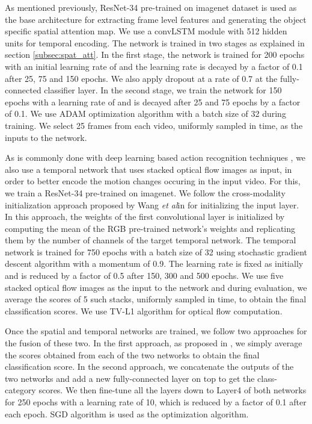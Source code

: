 \documentclass{bmvc2k}
\def\etal{\emph{et al}\bmvaOneDot}
\newcommand{\rev}[2]{#2}
\begin{document}
As mentioned previously, ResNet-34 pre-trained on imagenet dataset is used as the base architecture for extracting frame level features and generating the object specific spatial attention map. We use a convLSTM module with 512 hidden units for temporal encoding. The network is trained in two stages as explained in section \ref{subsec:spat_att}. In the first stage, the network is trained for 200 epochs with an initial learning rate of  and the learning rate is decayed by a factor of 0.1 after 25, 75 and 150 epochs. We also apply dropout at a rate of 0.7 at the fully-connected classifier layer. In the second stage, we train the network for 150 epochs with a learning rate of  and is decayed after 25 and 75 epochs by a factor of 0.1. We use ADAM optimization algorithm with a batch size of 32 during training. We select 25 frames from each video, uniformly sampled in time, as the inputs to the network.

As is commonly done with deep learning based action recognition techniques \cite{simonyan2014two} \cite{TSN2016ECCV} \cite{ma2016deeper} \cite{singh2016first} \cite{tang2017action} \cite{carreira2017quo}, we also use a temporal network that uses stacked optical flow images as input, in order to better encode the motion changes occuring in the input video. For this, we train a ResNet-34 pre-trained on imagenet. We follow the cross-modality initialization approach proposed by Wang \etal in \cite{TSN2016ECCV} for initializing the input layer. In this approach, the weights of the first convolutional layer is initialized by computing the mean of the RGB pre-trained network's weights and replicating them by the number of channels of the target temporal network. The temporal network is trained for 750 epochs with a batch size of 32 using stochastic gradient descent algorithm with a momentum of 0.9. The learning rate is fixed as  initially and is reduced by a factor of 0.5 after 150, 300 and 500 epochs. We use five stacked optical flow images as the input to the network and during evaluation, we average the scores of 5 such stacks, uniformly sampled in time, to obtain the final classification scores. We use TV-L1 algorithm \cite{zach2007duality} for optical flow computation.

Once the spatial and temporal networks are trained, we follow two approaches for the fusion of these two. In the first approach, as proposed in \cite{simonyan2014two}, we simply average the scores obtained from each of the two networks to obtain the final classification score. In the second approach, we concatenate the outputs of the two networks and add a new fully-connected layer on top to get the class-category scores. \rev{We then train the newly added fully-connected layer along with the fully-connected layers of the individual networks for 50 epochs with a learning rate of  which is reduced by a factor of 0.5 after 5, 20 and 50 epochs}{We then fine-tune all the layers down to Layer4 of both networks for 250 epochs with a learning rate of 10, which is reduced by a factor of 0.1 after each epoch}. \rev{ADAM}{SGD} algorithm is used as the optimization algorithm.
\end{document}
